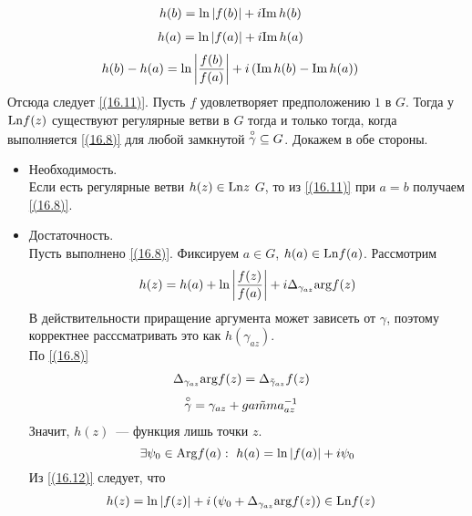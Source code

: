 \begin{align*}
  & h(b) = \ln \left| f(b) \right| + i \mathrm{Im}\, h(b)
\end{align*}
\begin{align*}
  & h(a) = \ln \left| f(a) \right| + i \mathrm{Im}\, h(a)
\end{align*}
\begin{align*}
  & h(b) - h(a) = \ln \left| \frac{f(b)}{f(a)} \right| + i \left( \mathrm{Im}\, h(b) - \mathrm{Im}\, h(a) \right)
\end{align*}
Отсюда следует \eqref{(16.11)}.
\theorem
Пусть $f$ удовлетворяет предположению $1$ в $G$. Тогда у  $\mathrm{Ln} f(z)$ существуют
регулярные ветви в $G$ тогда и только тогда, когда выполняется \eqref{(16.8)}
для любой замкнутой $\overset{\circ}{\gamma}\subseteq G$.
\pr
Докажем в обе стороны.
\begin{itemize}
    \item Необходимость.
    \\
    Если есть регулярные ветви $h(z) \in \mathrm{Ln} z$  $G$, то из \eqref{(16.11)} при
    $a = b$ получаем \eqref{(16.8)}.
    \item Достаточность.
    \\
    Пусть выполнено \eqref{(16.8)}. Фиксируем $a \in G$, $h(a) \in \mathrm{Ln} f(a)$.
    Рассмотрим
    \begin{equation}\label{(16.12)}
        h(z) = h(a) + \ln \left| \frac{f(z)}{f(a)} \right| + i \Delta_{\gamma_{az}}\mathrm{arg} f(z)
    \end{equation}
    В действительности приращение аргумента может зависеть от $\gamma$, поэтому
    корректнее расссматривать это как $h(\gamma_{az})$.
    \\
    По \eqref{(16.8)}
    \begin{align*}
      & \Delta_{\gamma_{az}}\mathrm{arg} f(z) = \Delta_{\tilde{\gamma}_{az}} f(z)
    \end{align*}
    \begin{align*}
      & \overset{\circ}{\gamma} = \gamma_{az}+\tilde{gamma}^{-1}_{az}
    \end{align*}
    Значит, $h(z)$~--- функция лишь точки $z$.
    \begin{equation}\label{(16.13)}
        \exists \psi_0 \in \mathrm{Arg} f(a): \ h(a) = \ln \left| f(a) \right| + i \psi_0
    \end{equation}
    Из \eqref{(16.12)} следует, что
    \begin{align*}
      & h(z) = \ln \left| f(z) \right| + i \left( \psi_0 + \Delta_{\gamma_{az}}\mathrm{arg} f(z) \right) \in \mathrm{Ln} f(z)
    \end{align*}

\end{itemize}
